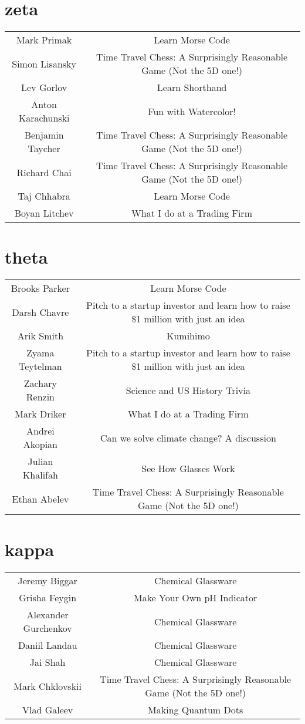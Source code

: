 \documentclass{article}
\begin{document}
\section*{zeta}
\setlength{\tabcolsep}{60pt}
\begin{tabular}{c c}
Mark Primak & Learn Morse Code \\
Simon Lisansky & Time Travel Chess: A Surprisingly Reasonable Game (Not the 5D one!) \\
Lev Gorlov & Learn Shorthand \\
Anton Karachunski & Fun with Watercolor! \\
Benjamin Taycher & Time Travel Chess: A Surprisingly Reasonable Game (Not the 5D one!) \\
Richard Chai & Time Travel Chess: A Surprisingly Reasonable Game (Not the 5D one!) \\
Taj Chhabra & Learn Morse Code \\
Boyan Litchev & What I do at a Trading Firm \\
\end{tabular}
\section*{theta}
\setlength{\tabcolsep}{60pt}
\begin{tabular}{c c}
Brooks Parker & Learn Morse Code \\
Darsh Chavre & Pitch to a startup investor and learn how to raise \$1 million with just an idea \\
Arik Smith & Kumihimo \\
Zyama Teytelman & Pitch to a startup investor and learn how to raise \$1 million with just an idea \\
Zachary Renzin & Science and US History Trivia \\
Mark Driker & What I do at a Trading Firm \\
Andrei Akopian & Can we solve climate change? A discussion \\
Julian Khalifah & See How Glasses Work \\
Ethan Abelev & Time Travel Chess: A Surprisingly Reasonable Game (Not the 5D one!) \\
\end{tabular}
\section*{kappa}
\setlength{\tabcolsep}{60pt}
\begin{tabular}{c c}
Jeremy Biggar & Chemical Glassware \\
Grisha Feygin & Make Your Own pH Indicator \\
Alexander Gurchenkov & Chemical Glassware \\
Daniil Landau & Chemical Glassware \\
Jai Shah & Chemical Glassware \\
Mark Chklovskii & Time Travel Chess: A Surprisingly Reasonable Game (Not the 5D one!) \\
Vlad Galeev & Making Quantum Dots \\
\end{tabular}
\end{document}
